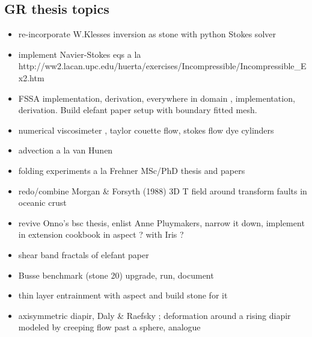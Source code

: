 \subsection{GR thesis topics}
\begin{itemize} 
\item re-incorporate W.Klesses inversion as stone with python Stokes solver
\item implement Navier-Stokes eqs a la http://ww2.lacan.upc.edu/huerta/exercises/Incompressible/Incompressible\_Ex2.htm
\item FSSA implementation, derivation, everywhere in domain \cite{sctc20}, implementation, derivation. Build elefant paper
      setup with boundary fitted mesh.
\item numerical viscosimeter \cite{batt84}, taylor couette flow, stokes flow dye cylinders
\item advection a la van Hunen
\item folding experiments a la Frehner MSc/PhD thesis and papers 
\item redo/combine Morgan \& Forsyth (1988) \cite{mofo88} 3D T field around transform faults in oceanic crust
\item revive Onno's bsc thesis, enlist Anne Pluymakers, narrow it down, implement in extension 
      cookbook in aspect ? with Iris ?
\item shear band fractals of elefant paper
\item Busse benchmark (stone 20) upgrade, run, document
\item thin layer entrainment with aspect and build stone for it 
\item axisymmetric diapir, Daly \& Raefsky \cite{dara85}; deformation around a rising diapir modeled by creeping 
      flow past a sphere, analogue \cite{crud88}
\end{itemize}

